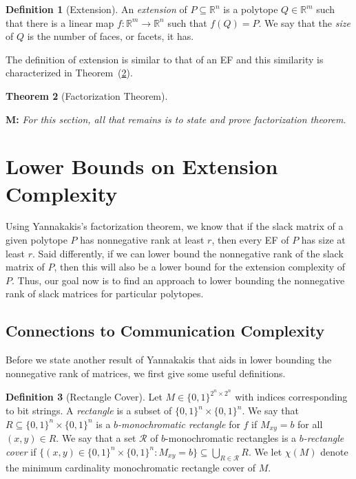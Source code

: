\documentclass{article}
\newtheorem{theorem}{\sc Theorem}
\theoremstyle{definition}
\newtheorem{definition}[theorem]{Definition}
\theoremstyle{remark}
\newcommand{\bits}{\{0,1\}}
\renewcommand{\R}{\mathbb{R}}
\newcommand{\mnote}[1]{{\color{blue}\noindent\textbf{M: }\marginpar{****}\textit{{#1}}}}
\begin{document}
\begin{definition}[Extension]
An \emph{extension} of $P \subseteq \R^n$ is a polytope $Q \in \R^m$ such that there is a linear map $f : \R^m \to \R^n$ such that $f(Q) = P$. We say that the \emph{size} of $Q$ is the number of faces, or facets, it has.
\end{definition}

The definition of extension is similar to that of an EF and this similarity is characterized in Theorem~(\ref{theor:factor}).

\begin{theorem}[Factorization Theorem]\label{theor:factor}
\end{theorem}

\mnote{For this section, all that remains is to state and prove factorization theorem.}

\section{Lower Bounds on Extension Complexity}

Using Yannakakis's factorization theorem, we know that if the slack matrix of a given polytope $P$ has nonnegative rank at least $r$, then every EF of $P$ has size at least $r$. Said differently, if we can lower bound the nonnegative rank of the slack matrix of $P$, then this will also be a lower bound for the extension complexity of $P$. Thus, our goal now is to find an approach to lower bounding the nonnegative rank of slack matrices for particular polytopes. 

\subsection{Connections to Communication Complexity}\label{sec:theorem4}

Before we state another result of Yannakakis that aids in lower bounding the nonnegative rank of matrices, we first give some useful definitions.

\begin{definition}[Rectangle Cover]
Let $M \in \bits^{2^n \times 2^n}$ with indices corresponding to bit strings. A \emph{rectangle} is a subset of $\bits^n \times \bits^n$. We say that $R \subseteq \bits^n \times \bits^n$ is a \emph{$b$-monochromatic rectangle} for $f$ if $M_{xy} = b$ for all $(x,y) \in R$. We say that a set $\mathcal{R}$ of $b$-monochromatic rectangles is a \emph{$b$-rectangle cover} if $\{(x,y) \in \bits^n \times \bits^n : M_{xy} = b\} \subseteq \bigcup_{R \in \mathcal{R}} R$.  We let $\chi(M)$ denote the minimum cardinality monochromatic rectangle cover of $M$.
\end{definition}
\end{document}
